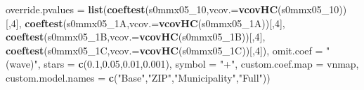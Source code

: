 \documentclass[
]{article}
\newenvironment{Shaded}{\begin{snugshade}}{\end{snugshade}}
\newcommand{\DataTypeTok}[1]{\textcolor[rgb]{0.13,0.29,0.53}{#1}}
\newcommand{\DecValTok}[1]{\textcolor[rgb]{0.00,0.00,0.81}{#1}}
\newcommand{\FloatTok}[1]{\textcolor[rgb]{0.00,0.00,0.81}{#1}}
\newcommand{\KeywordTok}[1]{\textcolor[rgb]{0.13,0.29,0.53}{\textbf{#1}}}
\newcommand{\NormalTok}[1]{#1}
\newcommand{\StringTok}[1]{\textcolor[rgb]{0.31,0.60,0.02}{#1}}
\begin{document}
\begin{Shaded}
\begin{Highlighting}[]
          \DataTypeTok{override.pvalues =} \KeywordTok{list}\NormalTok{(}\KeywordTok{coeftest}\NormalTok{(s0mmx05_}\DecValTok{10}\NormalTok{,}\DataTypeTok{vcov.=}\KeywordTok{vcovHC}\NormalTok{(s0mmx05_}\DecValTok{10}\NormalTok{))[,}\DecValTok{4}\NormalTok{],}
                                  \KeywordTok{coeftest}\NormalTok{(s0mmx05_1A,}\DataTypeTok{vcov.=}\KeywordTok{vcovHC}\NormalTok{(s0mmx05_1A))[,}\DecValTok{4}\NormalTok{],}
                                  \KeywordTok{coeftest}\NormalTok{(s0mmx05_1B,}\DataTypeTok{vcov.=}\KeywordTok{vcovHC}\NormalTok{(s0mmx05_1B))[,}\DecValTok{4}\NormalTok{],}
                                  \KeywordTok{coeftest}\NormalTok{(s0mmx05_1C,}\DataTypeTok{vcov.=}\KeywordTok{vcovHC}\NormalTok{(s0mmx05_1C))[,}\DecValTok{4}\NormalTok{]),}
          \DataTypeTok{omit.coef =} \StringTok{"(wave)"}\NormalTok{, }\DataTypeTok{stars =} \KeywordTok{c}\NormalTok{(}\FloatTok{0.1}\NormalTok{,}\FloatTok{0.05}\NormalTok{,}\FloatTok{0.01}\NormalTok{,}\FloatTok{0.001}\NormalTok{), }\DataTypeTok{symbol =} \StringTok{"+"}\NormalTok{,}
          \DataTypeTok{custom.coef.map =}\NormalTok{ vnmap, }
          \DataTypeTok{custom.model.names =} \KeywordTok{c}\NormalTok{(}\StringTok{"Base"}\NormalTok{,}\StringTok{"ZIP"}\NormalTok{,}\StringTok{"Municipality"}\NormalTok{,}\StringTok{"Full"}\NormalTok{))}
\end{Highlighting}
\end{Shaded}
\end{document}
